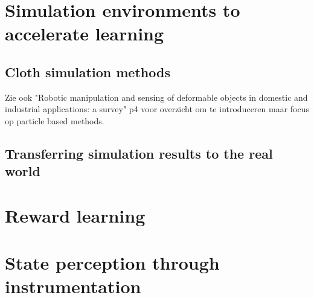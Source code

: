 \documentclass[\home/main.tex]{subfiles}
\begin{document}
\section{Simulation environments to accelerate learning} \label{sec:lit_simulation}
\subsection{Cloth simulation methods} \label{subsec:lit_cloth_sim}
Zie ook "Robotic manipulation and sensing of deformable objects in domestic and industrial applications: a survey" p4 voor overzicht om te introduceren maar focus op particle based methods.
\subsection{Transferring simulation results to the real world}  \label{sec:lit_sim2real}
\section{Reward learning}  \label{sec:lit_reward_learning}
\section{State perception through instrumentation} \label{sec:lit_instrumentation}
\end{document}
